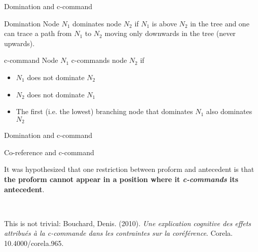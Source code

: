\documentclass{beamer}
\begin{document}
\begin{frame}{Domination and c-command}

\begin{block}{Domination}
Node $N_1$ dominates node $N_2$ if $N_1$ is above $N_2$ in the tree and one can trace a path from $N_1$ to $N_2$ moving only downwards in the tree (never upwards).
\end{block}

\begin{block}{c-command}
Node $N_1$ c-commands node $N_2$ if
\begin{itemize}
\item $N_1$ does not dominate $N_2$
\item $N_2$ does not dominate $N_1$
\item The first (i.e. the lowest) branching node that dominates $N_1$ also dominates $N_2$
\end{itemize}
\end{block}

\end{frame}

\begin{frame}{Domination and c-command}

\begin{center}
\end{center}

\end{frame}

\begin{frame}{Co-reference and c-command}

It was hypothesized that one restriction between proform and antecedent is that {\bfseries the proform cannot appear in a position where it \emph{c-commands} its antecedent}.

~\par

This is not trivial: Bouchard, Denis. (2010). \textit{Une explication cognitive des effets attribués à la c-commande dans les contraintes sur la coréférence}. Corela. 10.4000/corela.965.

\end{frame}
\end{document}
